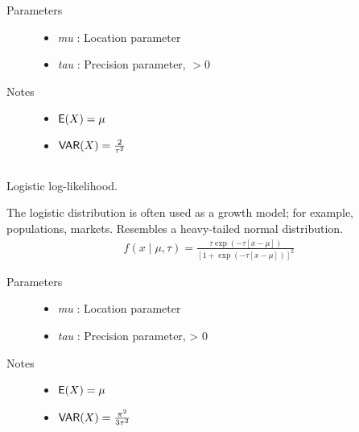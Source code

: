 \documentclass[]{jss}
\begin{document}
\begin{description}
\item[Parameters] \leavevmode\begin{itemize}

\item {} 
\emph{mu} : Location parameter

\item {} 
\emph{tau} : Precision parameter, $> 0$

\end{itemize}

\item[Notes]\leavevmode\begin{itemize}
\item {} 
$\mathsf{E}(X) = \mu$

\item {} 
$\mathsf{VAR}(X) = \frac{2}{\tau^2}$

\end{itemize}


\end{description}


\subsection[logistic]{}

Logistic log-likelihood.

The logistic distribution is often used as a growth model; for example,
populations, markets. Resembles a heavy-tailed normal distribution.
\begin{eqnarray*}
f(x \mid \mu, \tau) = \frac{\tau \exp(-\tau[x-\mu])}{[1 + \exp(-\tau[x-\mu])]^2}    
\end{eqnarray*}

\begin{description}
\item[Parameters] \leavevmode\begin{itemize}

\item {} 
\emph{mu} : Location parameter

\item {} 
\emph{tau} : Precision parameter, \textgreater{} 0

\end{itemize}

\item[Notes]\begin{itemize}
\item {} 
$\mathsf{E}(X) = \mu$

\item {} 
$\mathsf{VAR}(X) = \frac{\pi^2}{3\tau^2}$

\end{itemize}

\end{description}
\end{document}
